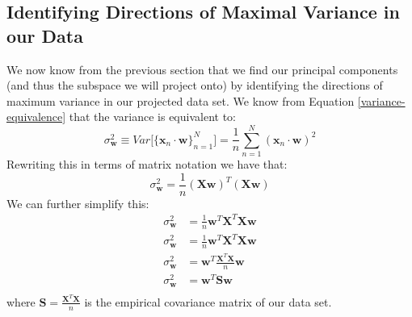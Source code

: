 \subsection{Identifying Directions of Maximal Variance in our Data}
We now know from the previous section that we find our principal components (and thus the subspace we will project onto) by identifying the directions of maximum variance in our projected data set. We know from Equation \ref{variance-equivalence} that the variance is equivalent to:
\begin{equation*}
    \sigma^{2}_{\textbf{w}} \equiv Var\big[\{\textbf{x}_{n} \cdot \textbf{w}\}_{n=1}^{N}\big] = \frac{1}{n} \sum_{n=1}^{N} (\textbf{x}_{n} \cdot \textbf{w})^{2}
\end{equation*}
Rewriting this in terms of matrix notation we have that:
\begin{equation*}
    \sigma^{2}_{\textbf{w}} = \frac{1}{n} (\textbf{X} \textbf{w})^{T} (\textbf{X} \textbf{w})
\end{equation*}
We can further simplify this:
\begin{align*}
    \sigma^{2}_{\textbf{w}} &= \frac{1}{n} \textbf{w}^{T}\textbf{X}^{T} \textbf{X} \textbf{w} \\
    \sigma^{2}_{\textbf{w}} &= \frac{1}{n} \textbf{w}^{T}\textbf{X}^{T} \textbf{X} \textbf{w} \\
    \sigma^{2}_{\textbf{w}} &= \textbf{w}^{T} \frac{\textbf{X}^{T}\textbf{X}}{n} \textbf{w} \\
    \sigma^{2}_{\textbf{w}} &= \textbf{w}^{T} \textbf{S} \textbf{w} \\
\end{align*}
where $\textbf{S} = \frac{\textbf{X}^{T}\textbf{X}}{n}$ is the empirical covariance matrix of our data set.


